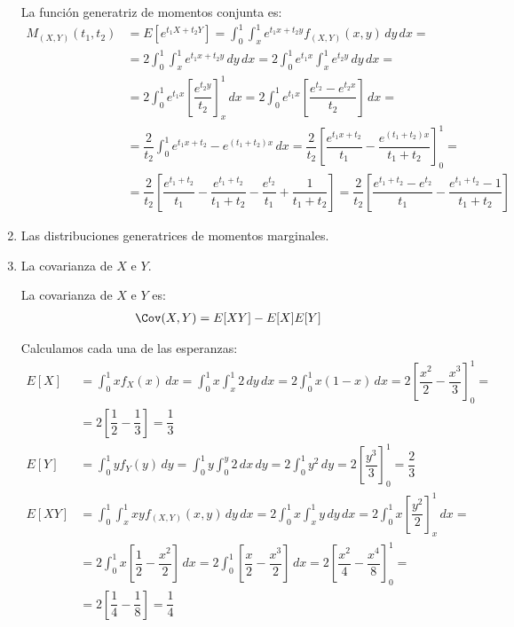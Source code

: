 \begin{ejercicio}
\begin{enumerate}
        La función generatriz de momentos conjunta es:
        \begin{align*}
            M_{(X,Y)}(t_1,t_2)&=E[e^{t_1X+t_2Y}]
            = \int_{0}^{1}\int_{x}^{1} e^{t_1x+t_2y} f_{(X,Y)}(x,y) \, dy \, dx
            =\\&= 2\int_{0}^{1}\int_{x}^{1} e^{t_1x+t_2y} \, dy \, dx
            = 2\int_{0}^{1} e^{t_1x}\int_{x}^{1} e^{t_2y} \, dy \, dx
            =\\&= 2\int_{0}^{1} e^{t_1x}\left[\dfrac{e^{t_2y}}{t_2}\right]_{x}^{1} \, dx
            = 2\int_{0}^{1} e^{t_1x}\left[\dfrac{e^{t_2}-e^{t_2x}}{t_2}\right] \, dx
            =\\&= \dfrac{2}{t_2}\int_{0}^{1} e^{t_1x+t_2}-e^{(t_1+t_2)x} \, dx
            = \dfrac{2}{t_2}\left[\dfrac{e^{t_1x+t_2}}{t_1}-\dfrac{e^{(t_1+t_2)x}}{t_1+t_2}\right]_{0}^{1}
            =\\&= \dfrac{2}{t_2}\left[\dfrac{e^{t_1+t_2}}{t_1}-\dfrac{e^{t_1+t_2}}{t_1+t_2}-\dfrac{e^{t_2}}{t_1}+\dfrac{1}{t_1+t_2}\right]
            = \dfrac{2}{t_2}\left[\dfrac{e^{t_1+t_2}-e^{t_2}}{t_1}-\dfrac{e^{t_1+t_2}-1}{t_1+t_2}\right]
        \end{align*}

        \item Las distribuciones generatrices de momentos marginales.
        \item La covarianza de $X$ e $Y$.
        
        La covarianza de $X$ e $Y$ es:
        \begin{align*}
            \Cov(X,Y)&=E[XY]-E[X]E[Y]
        \end{align*}

        Calculamos cada una de las esperanzas:
        \begin{align*}
            E[X] &= \int_{0}^{1} xf_X(x) \, dx
            = \int_{0}^{1}x \int_{x}^{1} 2 \, dy \, dx
            = 2\int_{0}^{1}x(1-x) \, dx
            = 2\left[\dfrac{x^2}{2}-\dfrac{x^3}{3}\right]_{0}^{1}
            =\\&= 2\left[\dfrac{1}{2}-\dfrac{1}{3}\right]
            = \dfrac{1}{3} \\
            E[Y] &= \int_{0}^{1} yf_Y(y) \, dy
            = \int_{0}^{1}y \int_{0}^{y} 2 \, dx \, dy
            = 2\int_{0}^{1}y^2 \, dy
            = 2\left[\dfrac{y^3}{3}\right]_{0}^{1}
            = \dfrac{2}{3} \\
            E[XY] &= \int_{0}^{1}\int_{x}^{1} xyf_{(X,Y)}(x,y) \, dy \, dx
            = 2\int_{0}^{1}x \int_{x}^{1} y \, dy \, dx
            = 2\int_{0}^{1}x\left[\dfrac{y^2}{2}\right]_{x}^{1} \, dx
            =\\&= 2\int_{0}^{1}x\left[\dfrac{1}{2}-\dfrac{x^2}{2}\right] \, dx
            = 2\int_{0}^{1}\left[\dfrac{x}{2}-\dfrac{x^3}{2}\right] \, dx
            = 2\left[\dfrac{x^2}{4}-\dfrac{x^4}{8}\right]_{0}^{1}
            =\\&= 2\left[\dfrac{1}{4}-\dfrac{1}{8}\right]
            = \dfrac{1}{4}
        \end{align*}


\end{enumerate}
\end{ejercicio}
